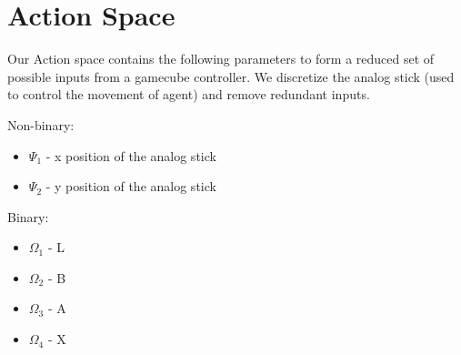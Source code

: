 \documentclass[11pt]{article}
\theoremstyle{quest}
\begin{document}
\section{Action Space}
Our Action space contains the following parameters to form a reduced set of possible inputs from a gamecube controller. We discretize the analog stick (used to control the movement of agent) and remove redundant inputs.  

\vspace{2mm}

Non-binary:

\begin{itemize}
\item $\Psi_{1}$ - x position of the analog stick
\item $\Psi_{2}$ - y position of the analog stick
\end{itemize}

\vspace{2mm}

Binary:

\begin{itemize}
\item $\Omega_{1}$ - L 
\item $\Omega_{2}$ - B
\item $\Omega_{3}$ - A
\item $\Omega_{4}$ - X
\end{itemize}
\end{document}
